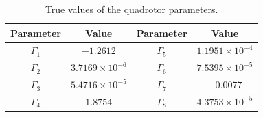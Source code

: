 \documentclass[3p]{elsarticle}
\begin{document}
\begin{table}[H]
    \renewcommand{\arraystretch}{1.3}
    \caption{True values of the quadrotor parameters.}
    \vspace{-0.5cm}
    \begin{center}
    \begin{tabular}{c c c c}
    \hline
    Parameter & Value & Parameter & Value  \\
    \hline
    $\Gamma_1$ & $-1.2612$ & $\Gamma_5$ & $1.1951\times10^{-4}$ \\

    $\Gamma_2$ & $3.7169\times10^{-6}$ & $\Gamma_6$ & $7.5395\times10^{-5}$ \\

    $\Gamma_3$ &$5.4716\times10^{-5}$ & $\Gamma_7$ & $-0.0077$ \\

    $\Gamma_4$ & $1.8754$ & $\Gamma_8$ & $4.3753\times10^{-5}$ \\
    \hline
    \end{tabular}
    \label{tab:true_parameters}
    \end{center}
\end{table}
\end{document}
